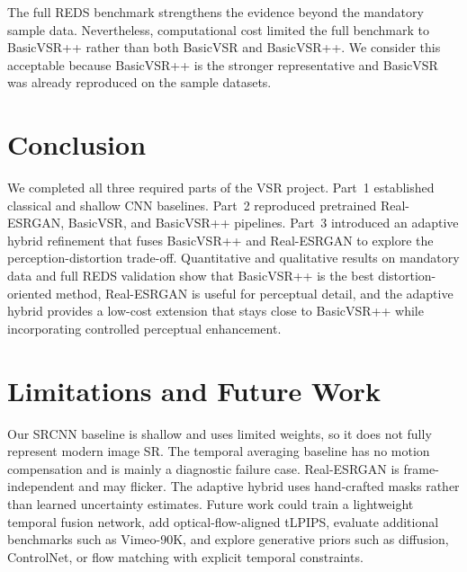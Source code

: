 \documentclass[10pt,twocolumn,letterpaper]{article}
\begin{document}
The full REDS benchmark strengthens the evidence beyond the mandatory sample data. Nevertheless, computational cost limited the full benchmark to BasicVSR++ rather than both BasicVSR and BasicVSR++. We consider this acceptable because BasicVSR++ is the stronger representative and BasicVSR was already reproduced on the sample datasets.

\section{Conclusion}
We completed all three required parts of the VSR project. Part~1 established classical and shallow CNN baselines. Part~2 reproduced pretrained Real-ESRGAN, BasicVSR, and BasicVSR++ pipelines. Part~3 introduced an adaptive hybrid refinement that fuses BasicVSR++ and Real-ESRGAN to explore the perception-distortion trade-off. Quantitative and qualitative results on mandatory data and full REDS validation show that BasicVSR++ is the best distortion-oriented method, Real-ESRGAN is useful for perceptual detail, and the adaptive hybrid provides a low-cost extension that stays close to BasicVSR++ while incorporating controlled perceptual enhancement.

\section*{Limitations and Future Work}
Our SRCNN baseline is shallow and uses limited weights, so it does not fully represent modern image SR. The temporal averaging baseline has no motion compensation and is mainly a diagnostic failure case. Real-ESRGAN is frame-independent and may flicker. The adaptive hybrid uses hand-crafted masks rather than learned uncertainty estimates. Future work could train a lightweight temporal fusion network, add optical-flow-aligned tLPIPS, evaluate additional benchmarks such as Vimeo-90K, and explore generative priors such as diffusion, ControlNet, or flow matching with explicit temporal constraints.



\end{document}
